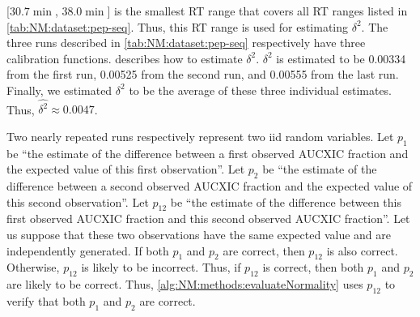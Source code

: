 [\(30.7\min\), \(38.0\min\)] is the smallest \gls{RT} range that covers all \gls{RT} ranges listed in \cref{tab:NM:dataset:pep-seq}.
Thus, this \gls{RT} range is used for estimating \(\delta^2\).
The three runs described in \cref{tab:NM:dataset:pep-seq} respectively have three calibration functions.
 describes how to estimate \(\delta^2\).
\(\delta^2\) is estimated to be 0.00334 from the first run, 0.00525 from the second run, and 0.00555 from the last run.
Finally, we estimated \(\delta^2\) to be the average of these three individual estimates.
Thus, \(\widehat{\delta^2} \approx 0.0047\). 
		
Two nearly repeated runs respectively represent two \gls{iid} random variables.
Let \(p_1\) be ``the estimate of the difference between a first  observed \gls{AUCXIC} fraction and the expected value of this first  observation''.
Let \(p_2\) be ``the estimate of the difference between a second observed \gls{AUCXIC} fraction and the expected value of this second observation''.
Let \(p_{12}\) be ``the estimate of the difference between this first observed \gls{AUCXIC} fraction and this second observed \gls{AUCXIC} fraction''.
Let us suppose that these two observations have the same expected value and are independently generated.
If both \(p_1\) and \(p_2\) are correct, then \(p_{12}\) is also correct.
Otherwise, \(p_{12}\) is likely to be incorrect.
Thus, if \(p_{12}\) is correct, then both \(p_1\) and \(p_2\) are likely to be correct.
Thus, \cref{alg:NM:methods:evaluateNormality} uses \(p_{12}\) to verify that both \(p_1\) and \(p_2\) are correct.
		
